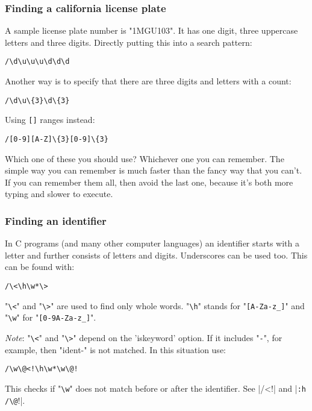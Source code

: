 \subsubsection{Finding a california license plate}
A sample license plate number is "1MGU103".
It has one digit, three uppercase letters and three digits.
Directly putting this into a search pattern:

\begin{Verbatim}[samepage=true]
 /\d\u\u\u\d\d\d
\end{Verbatim}

Another way is to specify that there are three digits and letters with a count:

\begin{Verbatim}[samepage=true]
 /\d\u\{3}\d\{3}
\end{Verbatim}

Using \verb![]! ranges instead:

\begin{Verbatim}[samepage=true]
 /[0-9][A-Z]\{3}[0-9]\{3}
\end{Verbatim}

Which one of these you should use?  Whichever one you can remember.
The simple way you can remember is much faster than the fancy way that you can't.
If you can remember them all, then avoid the last one, because it's both more typing and slower to execute.

\subsubsection{Finding an identifier}
In C programs (and many other computer languages) an identifier starts with a letter and further consists of letters and digits.
Underscores can be used too.
This can be found with:

\begin{Verbatim}[samepage=true]
 /\<\h\w*\>
\end{Verbatim}

"\verb!\<!" and "\verb!\>!" are used to find only whole words.
"\verb!\h!" stands for "\verb![A-Za-z_]!" and "\verb!\w!" for "\verb![0-9A-Za-z_]!".

\emph{Note}:
"\verb!\<!" and "\verb!\>!" depend on the 'iskeyword' option.
If it includes "\verb!-!", for example, then "ident-" is not matched.
In this situation use:

\begin{Verbatim}[samepage=true]
     /\w\@<!\h\w*\w\@!
\end{Verbatim}
 
This checks if "\verb!\w!" does not match before or after the identifier.
See |/\@<!| and |\verb!:h /\@!!|.
\clearpage
